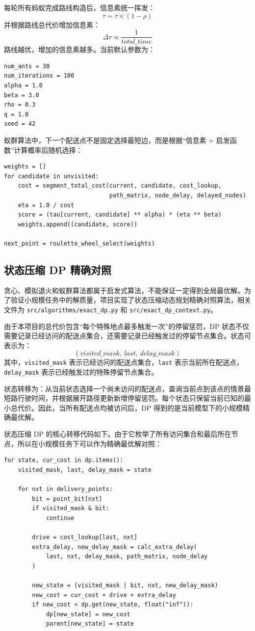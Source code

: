 \documentclass[12pt,a4paper,UTF8]{article}
\begin{document}
每轮所有蚂蚁完成路线构造后，信息素统一挥发：
\[
    \tau = \tau \times (1-\rho)
\]
并根据路线总代价增加信息素：
\[
    \Delta\tau \propto \frac{1}{total\_time}
\]
路线越优，增加的信息素越多。当前默认参数为：
\begin{verbatim}
num_ants = 30
num_iterations = 100
alpha = 1.0
beta = 3.0
rho = 0.3
q = 1.0
seed = 42
\end{verbatim}

蚁群算法中，下一个配送点不是固定选择最短边，而是根据“信息素 + 启发函数”计算概率后随机选择：

\begin{lstlisting}[caption={蚁群算法的转移概率计算}]
weights = []
for candidate in unvisited:
    cost = segment_total_cost(current, candidate, cost_lookup,
                              path_matrix, node_delay, delayed_nodes)
    eta = 1.0 / cost
    score = (tau[current, candidate] ** alpha) * (eta ** beta)
    weights.append((candidate, score))

next_point = roulette_wheel_select(weights)
\end{lstlisting}

\subsection{状态压缩 DP 精确对照}

贪心、模拟退火和蚁群算法都属于启发式算法，不能保证一定得到全局最优解。为了验证小规模任务中的解质量，项目实现了状态压缩动态规划精确对照算法，相关文件为 \texttt{src/algorithms/exact\_dp.py} 和 \texttt{src/exact\_dp\_context.py}。

由于本项目的总代价包含“每个特殊地点最多触发一次”的停留惩罚，DP 状态不仅需要记录已经访问的配送点集合，还需要记录已经触发过的停留节点集合。状态可表示为：
\[
    (visited\_mask,\ last,\ delay\_mask)
\]
其中，\verb|visited_mask| 表示已经访问的配送点集合，\verb|last| 表示当前所在配送点，\verb|delay_mask| 表示已经触发过的特殊停留节点集合。

状态转移为：从当前状态选择一个尚未访问的配送点，查询当前点到该点的情景最短路行驶时间，并根据展开路径更新新增停留惩罚。每个状态只保留当前已知的最小总代价。因此，当所有配送点均被访问后，DP 得到的是当前模型下的小规模精确最优解。

状态压缩 DP 的核心转移代码如下。由于它枚举了所有访问集合和最后所在节点，所以在小规模任务下可以作为精确最优解对照：

\begin{lstlisting}[caption={状态压缩 DP 的核心状态转移}]
for state, cur_cost in dp.items():
    visited_mask, last, delay_mask = state

    for nxt in delivery_points:
        bit = point_bit[nxt]
        if visited_mask & bit:
            continue

        drive = cost_lookup[last, nxt]
        extra_delay, new_delay_mask = calc_extra_delay(
            last, nxt, delay_mask, path_matrix, node_delay
        )

        new_state = (visited_mask | bit, nxt, new_delay_mask)
        new_cost = cur_cost + drive + extra_delay
        if new_cost < dp.get(new_state, float("inf")):
            dp[new_state] = new_cost
            parent[new_state] = state
\end{lstlisting}
\end{document}
